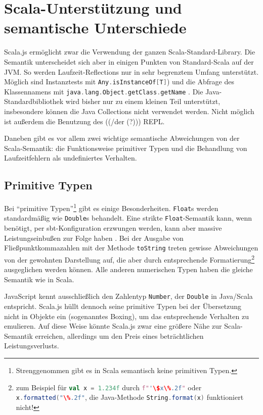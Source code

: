 \documentclass[a4paper, 12pt, hidelinks, listof=totoc, listoftables=totoc, bibliography=totoc]{scrreprt}
\newcommand{\scala}[1]{\lstinline[language=Scala, style=inline]|#1|}
\begin{document}
\section{Scala-Unterstützung und semantische Unterschiede}

Scala.js ermöglicht zwar die Verwendung der ganzen Scala-Standard-Library. Die Semantik unterscheidet sich aber in einigen Punkten von Standard-Scala auf der JVM. So werden Laufzeit-Reflections nur in sehr begrenztem Umfang unterstützt. Möglich sind Instanztests mit \scala{Any.isInstanceOf[T]}) \cite[S. 2 f.]{doeraene2013.TDI} und die Abfrage des Klassennamens mit \scala{java.lang.Object.getClass.getName} \cite{scalajs.DSS}. Die Java-Standardbibliothek wird bisher nur zu einem kleinen Teil unterstützt\cite{doeraene2014.WHB}, insbesondere können die Java Collections nicht verwendet werden. Nicht möglich ist außerdem die Benutzung des ((/der (?))) \ac{REPL}\cite{doeraene2013.CSJ}.

Daneben gibt es vor allem zwei wichtige semantische Abweichungen von der Scala-Semantik: die Funktionsweise primitiver Typen und die Behandlung von Laufzeitfehlern als undefiniertes Verhalten.


\subsection{Primitive Typen}

Bei "`primitive Typen"'\footnote{Strenggenommen gibt es in Scala semantisch keine primitiven Typen.} gibt es einige Besonderheiten. \scala{Float}s werden standardmäßig wie \scala{Double}s behandelt. Eine strikte \scala{Float}-Semantik kann, wenn benötigt, per sbt-Konfiguration erzwungen werden, kann aber massive Leistungseinbußen zur Folge haben \cite[S.~2]{doeraene2013.TDI}\cite{scalajs.DSS}. 
Bei der Ausgabe von Fließpunktkommazahlen mit der Methode \scala{toString} treten gewisse Abweichungen von der gewohnten Darstellung auf, die aber durch entsprechende Formatierung\footnote{zum Beispiel für \scala{val x = 1.234f} durch \scala{f"'\$x\%.2f"} oder \scala{x.formatted("\%.2f"}, die Java-Methode \scala{String.format(x)} funktioniert nicht!} ausgeglichen werden können. Alle anderen numerischen Typen haben die gleiche Semantik wie in Scala. 

JavaScript kennt ausschließlich den Zahlentyp \scala{Number}, der \scala{Double} in Java/Scala entspricht. Scala.js hüllt dennoch seine primitive Typen bei der Übersetzung nicht in Objekte ein (sogenanntes Boxing), um das entsprechende Verhalten zu emulieren. Auf diese Weise könnte Scala.js zwar eine größere Nähe zur Scala-Semantik erreichen, allerdings um den Preis eines beträchtlichen Leistungsverlusts. \cite[S. 2]{doeraene2013.TDI}\cite[\#ThePerformance/CorrectnessTradeoff]{haoyi.HOS}
\end{document}
